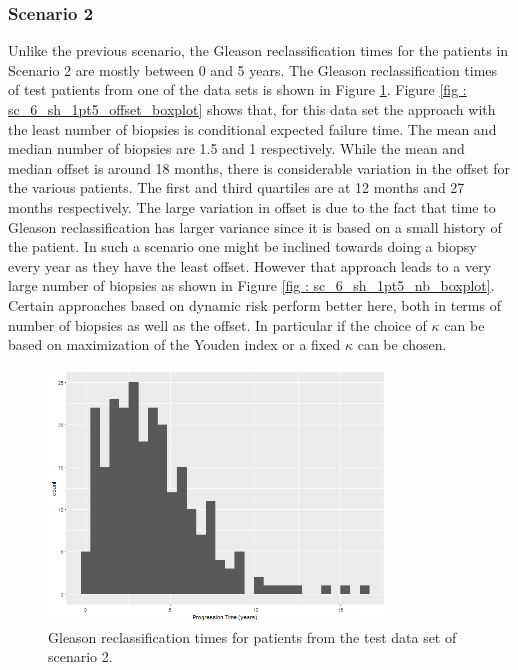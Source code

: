 \subsubsection{Scenario 2}
Unlike the previous scenario, the Gleason reclassification times for the patients in Scenario 2 are mostly between 0 and 5 years. The Gleason reclassification times of test patients from one of the data sets is shown in Figure \ref{fig : sc_6_sh_1pt5_progression_hist}. Figure \ref{fig : sc_6_sh_1pt5_offset_boxplot} shows that, for this data set the approach with the least number of biopsies is conditional expected failure time. The mean and median number of biopsies are 1.5 and 1 respectively. While the mean and median offset is around 18 months, there is considerable variation in the offset for the various patients. The first and third quartiles are at 12 months and 27 months respectively. The large variation in offset is due to the fact that time to Gleason reclassification has larger variance since it is based on a small history of the patient. In such a scenario one might be inclined towards doing a biopsy every year as they have the least offset. However that approach leads to a very large number of biopsies as shown in Figure \ref{fig : sc_6_sh_1pt5_nb_boxplot}. Certain approaches based on dynamic risk perform better here, both in terms of number of biopsies as well as the offset. In particular if the choice of $\kappa$ can be based on maximization of the Youden index or a fixed $\kappa$ can be chosen.

\begin{figure}[H]
\centering
\captionsetup{justification=centering}
\includegraphics[width=0.8\textwidth]{sim_study_res_sc_6_sh_1pt5/progression_hist.png}
\caption{\label{fig : sc_6_sh_1pt5_progression_hist} Gleason reclassification times for patients from the test data set of scenario 2.}
\end{figure}

